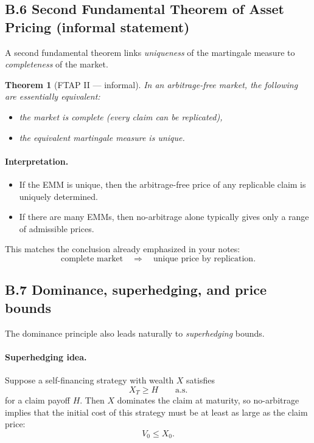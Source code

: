 \documentclass[11pt]{article}
\newcommand{\1}{\mathbf{1}}
\newtheorem{theorem}{Theorem}
\begin{document}
\subsection*{B.6 Second Fundamental Theorem of Asset Pricing (informal statement)}

A second fundamental theorem links \emph{uniqueness} of the martingale measure to \emph{completeness} of the market.

\begin{theorem}[FTAP II --- informal]
In an arbitrage-free market, the following are essentially equivalent:
\begin{itemize}[leftmargin=1.4em]
    \item the market is complete (every claim can be replicated),
    \item the equivalent martingale measure is unique.
\end{itemize}
\end{theorem}

\paragraph{Interpretation.}
\begin{itemize}[leftmargin=1.4em]
    \item If the EMM is unique, then the arbitrage-free price of any replicable claim is uniquely determined.
    \item If there are many EMMs, then no-arbitrage alone typically gives only a range of admissible prices.
\end{itemize}

This matches the conclusion already emphasized in your notes:
$$
\text{complete market} \quad \Longrightarrow \quad \text{unique price by replication}.
$$

\subsection*{B.7 Dominance, superhedging, and price bounds}

The dominance principle also leads naturally to \emph{superhedging} bounds.

\paragraph{Superhedging idea.}
Suppose a self-financing strategy with wealth \(X\) satisfies
$$
X_T \ge H
\qquad \text{a.s.}
$$
for a claim payoff \(H\).
Then \(X\) dominates the claim at maturity, so no-arbitrage implies that the initial cost of this strategy must be at least as large as the claim price:
$$
\boxed{\ V_0 \le X_0. \ }
$$
\end{document}
